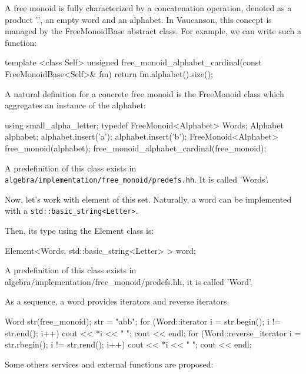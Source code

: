\documentclass{article}
\begin{document}
A free monoid is fully characterized by a concatenation operation,
denoted as a product '.', an empty word and an alphabet. In Vaucanson,
this concept is managed by the FreeMonoidBase abstract class. For
example, we can write such a function:

\begin{code}
template <class Self>
unsigned free_monoid_alphabet_cardinal(const FreeMonoidBase<Self>& fm)
{
  return fm.alphabet().size();
}
\end{code}

A natural definition for a concrete free monoid is the FreeMonoid
class which aggregates an instance of the alphabet:

\begin{code}
{
  using small_alpha_letter;
  typedef FreeMonoid<Alphabet>  Words;
  Alphabet     alphabet;
  alphabet.insert('a');
  alphabet.insert('b');
  FreeMonoid<Alphabet> free_monoid(alphabet);
  free_monoid_alphabet_cardinal(free_monoid);
}
\end{code}

A predefinition of this class exists in
\verb!algebra/implementation/free_monoid/predefs.hh!. It is called 'Words'.

Now, let's work with element of this set. Naturally, a word can be
implemented with a \verb!std::basic_string<Letter>!.

Then, its type using the Element class is:

\begin{code}
{
  Element<Words, std::basic_string<Letter> > word;
}
\end{code}

A predefinition of this class exists in
algebra/implementation/free\_monoid/predefs.hh, it is called 'Word'.

As a sequence, a word provides iterators and reverse iterators. 

\begin{code}
  Word str(free_monoid);
  str = "abb";
  for (Word::iterator i = str.begin(); i != str.end(); i++)
    cout << *i << " ";
  cout << endl;
  for (Word::reverse_iterator i = str.rbegin(); i != str.rend(); i++)
    cout << *i << " ";
  cout << endl;
\end{code}

Some others services and external functions are proposed:
\end{document}
